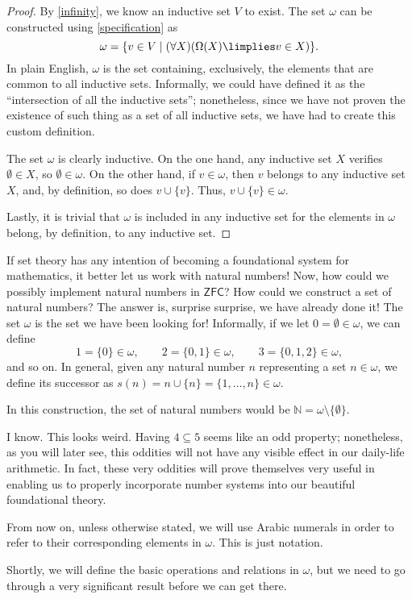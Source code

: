\begin{proof}
By \ref{infinity}, we know an inductive set $V$ to exist. The set $\omega$ can be constructed using \ref{specification} as
\[ \omega = \{v\in V\mid (\forall X)(\Omega(X)\limplies v\in X)\}.\]
In plain English, $\omega$ is the set containing, exclusively, the elements that are common to all inductive sets.
Informally, we could have defined it as the ``intersection of all the inductive sets''; nonetheless, since we have not proven the existence of such thing as a set of all inductive sets, we have had to create this custom definition.

The set $\omega$ is clearly inductive. On the one hand, any inductive set $X$ verifies $\emptyset \in X$, so $\emptyset\in \omega$.
On the other hand, if $v\in\omega$, then $v$ belongs to any inductive set $X$, and, by definition, so does $v\cup\{v\}$. Thus, $v\cup\{v\}\in \omega$.

Lastly, it is trivial that $\omega$ is included in any inductive set for the elements in $\omega$ belong, by definition, to any inductive set.
\end{proof}


\begin{para}
If set theory has any intention of becoming a foundational system for mathematics, it better let us work with natural numbers!
Now, how could we possibly implement natural numbers in $\mathsf{ZFC}$? How could we construct a set of natural numbers?
The answer is, surprise surprise, we have already done it! The set $\omega$ is the set we have been looking for! Informally, if we let $0 = \emptyset\in \omega$, we can define
\[ 1 = \{0\}\in \omega,\qquad 2 = \{0,1\} \in \omega, \qquad 3 = \{0,1,2\}\in \omega,\]
and so on. In general, given any natural number $n$ representing a set $n\in \omega$, we define its successor as $s(n) = n \cup \{n\} = \{1,\ldots,n\}\in \omega$. 

In this construction, the set of natural numbers would be $\mathbb{N} = \omega \setminus \{\emptyset\}$.

I know. This looks weird. Having $4\subseteq 5$ seems like an odd property; nonetheless, as you will later see, this oddities will not have any visible effect in our daily-life arithmetic.
In fact, these very oddities will prove themselves very useful in enabling us to properly incorporate number systems into our beautiful foundational theory.

From now on, unless otherwise stated, we will use Arabic numerals in order to refer to their corresponding elements in $\omega$. This is just notation.

Shortly, we will define the basic operations and relations in $\omega$, but we need to go through a very significant result before we can get there.
\end{para}

